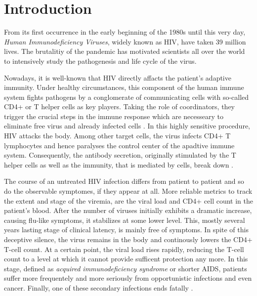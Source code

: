 \section{Introduction}
\label{sec:intro}

From its first occurrence in the early beginning of the 1980s until this very day, 
\textit{Human Immunodeficiency Viruses}, widely known as HIV, have taken 39 million lives.
The brutalitiy of the pandemic has motivated scientists all over the world to intensively study the
pathogenesis and life cycle of the virus.\par

Nowadays, it is well-known that HIV directly affacts the patient’s adaptive immunity.
Under healthy circumstances, this component of the human immune system fights pathogens by a 
conglomerate of communicating cells with so-called CD4+ or T helper cells as key players.
Taking the role of coordinators, they trigger the crucial steps in the immune response which are 
necesseary to eliminate free virus and already infected cells \cite{alberts2002helper}.\newline
In this highly sensitive procedure, HIV attacks the body.
Among other target cells, the virus infects CD4+ T lymphocytes and hence paralyses the control center of the apadtive immune
system.
Consequently, the antibody secretion, originally stimulated by the T helper cells as well as the immunity, that is mediated by cells,
break down \cite{buselmaier2018biologie}.\par

The course of an untreated HIV infection differs from patient to patient and so do the observable symptomes, 
if they appear at all.
More reliable metrics to track the extent and stage of the viremia, are the viral load and CD4+ cell 
count in the patient's blood.
After the number of viruses initially exhibits a dramatic increase, causing flu-like symptoms, it stabilizes at some lower level.
This, mostly several years lasting stage of clinical latency, is mainly free of symptoms.
In spite of this deceptive silence, the virus remains in the body and continously lowers the CD4+ T-cell count.
At a certain point, the viral load rises rapidly, reducing the T-cell count to a level at which it cannot provide 
sufficent protection any more.
In this stage, defined as \textit{acquired immunodeficiency syndrome} or shorter AIDS, patients suffer more frequentely 
and more seriously from opportunistic infections and even cancer.
Finally, one of these secondary infections ends fatally \cite{mittler1998influence}.\par

